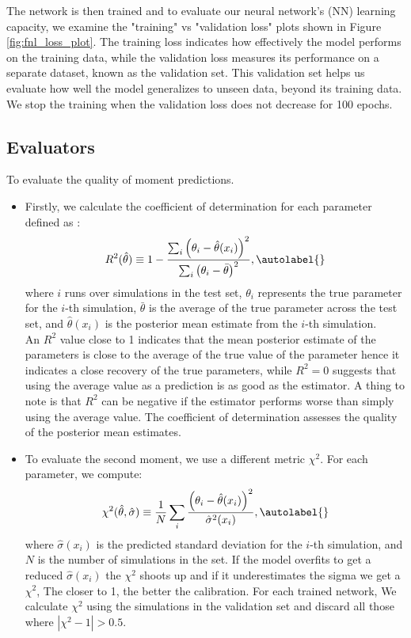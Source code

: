 The network is then trained and to evaluate our neural network's (NN) learning capacity, we examine the "training" vs "validation loss" plots shown in Figure \ref{fig:fnl_loss_plot}. The training loss indicates how effectively the model performs on the training data, while the validation loss measures its performance on a separate dataset, known as the validation set. This validation set helps us evaluate how well the model generalizes to unseen data, beyond its training data. We stop the training when the validation loss does not decrease for 100 epochs.






\subsection{Evaluators}


To evaluate the quality of moment predictions.
\begin{itemize}
    \item Firstly, we calculate the coefficient of determination for each parameter defined as :
        \begin{equation}
        R^2(\hat{\theta}) \equiv 1 - \frac{\sum_i \left(\theta_i - \hat{\theta}(x_i)\right)^2}{\sum_i \left(\theta_i - \bar{\theta}\right)^2}, \autolabel{}
        \end{equation}
        where $i$ runs over simulations in the test set, $\theta_i$ represents the true parameter for the $i$-th simulation, $\bar{\theta}$ is the average of the true parameter across the test set, and $\hat{\theta}(x_i)$ is the posterior mean estimate from the $i$-th simulation.\\
        An $R^2$ value close to 1 indicates that the mean posterior estimate of the parameters is close to the average of the true value of the parameter hence it indicates a close recovery of the true parameters, while $R^2 = 0$ suggests that using the average value as a prediction is as good as the estimator. A thing to note is that $R^2$ can be negative if the estimator performs worse than simply using the average value.
        The coefficient of determination assesses the quality of the posterior mean estimates. 
        
        \item To evaluate the second moment, we use a different metric $\chi^2$. For each parameter, we compute:
        \begin{equation}
            \chi^2(\hat{\theta}, \hat{\sigma}) \equiv \frac{1}{N} \sum_i \frac{\left(\theta_i - \hat{\theta}(x_i)\right)^2}{\hat{\sigma}^2(x_i)},\autolabel{}
        \end{equation}
        where $\hat{\sigma}(x_i)$ is the predicted standard deviation for the $i$-th simulation, and $N$ is the number of simulations in the set. If the model overfits to get a reduced $\hat{\sigma}(x_i)$ the  $\chi^2$ shoots up and if it underestimates the sigma we get a $\chi^2$, The closer to 1, the better the calibration. For each trained network, We calculate $\chi^2$ using the simulations in the validation set and discard all those where $|\chi^2 - 1| > 0.5$. 
        
\end{itemize}
